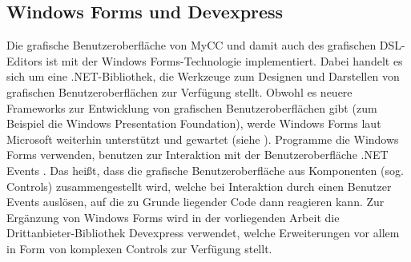 \subsection{Windows Forms und Devexpress}
Die grafische Benutzeroberfläche von MyCC und damit auch des grafischen DSL-Editors ist mit der Windows Forms-Technologie implementiert. Dabei handelt es sich um eine .NET-Bibliothek, die Werkzeuge zum Designen und Darstellen von grafischen Benutzeroberflächen zur Verfügung stellt. Obwohl es neuere Frameworks zur Entwicklung von grafischen Benutzeroberflächen gibt (zum Beispiel die Windows Presentation Foundation), werde Windows Forms laut Microsoft weiterhin unterstützt und gewartet (siehe \cite{Allen:14}). Programme die Windows Forms verwenden, benutzen zur Interaktion mit der Benutzeroberfläche .NET Events \cite[S. 171ff]{Platt:03}. Das heißt, dass die grafische Benutzeroberfläche aus Komponenten (sog. Controls) zusammengestellt wird, welche bei Interaktion durch einen Benutzer Events auslösen, auf die zu Grunde liegender Code dann reagieren kann. Zur Ergänzung von Windows Forms wird in der vorliegenden Arbeit die Drittanbieter-Bibliothek Devexpress verwendet, welche Erweiterungen vor allem in Form von komplexen Controls zur Verfügung stellt. 